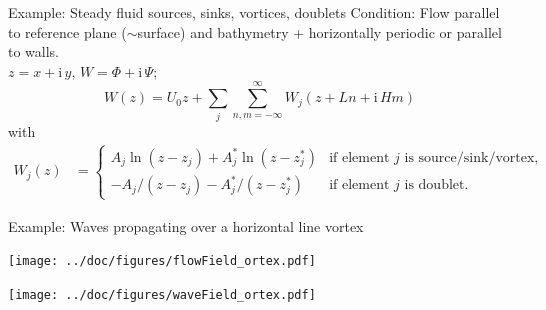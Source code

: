\documentclass{sintefbeamer}
\newcommand{\mr}{\mathrm}
\newcommand{\ii}{\mr{i}\,}
\renewcommand{\_}[1]{_\mr{#1}}
\begin{document}
\begin{frame}{Example: Steady fluid sources, sinks, vortices, doublets}
	Condition: Flow parallel to reference plane ($\sim$surface) and bathymetry + horizontally periodic or parallel to walls.\\
	$z=x+\ii y$, $W=\Phi + \ii\Psi$;
	\begin{equation*}
		W(z) =  U_0 z + \sum_j \sum_{n,m=-\infty}^{\infty} W_j(z + L n + \ii H m)
	\end{equation*}
	with
	\begin{align*}
		W_j(z) &= 
		\begin{cases}
			A_j\ln(z-z_j) + A_j^*\ln(z-z_j^*) & \text{if element $j$ is source/sink/vortex,}\\
			-A_j/(z-z_j)-A_j^*/(z-z_j^*) & \text{if element $j$ is doublet.}
		\end{cases}
	\end{align*}
\end{frame}

\begin{frame}{Example: Waves propagating over a horizontal line vortex}
\centering
\vspace{-.25cm}
\begin{minipage}{.5\framewidth}
\texttt{[image: ../doc/figures/flowField\_vortex.pdf]}%
\end{minipage}%
\texttt{[image: ../doc/figures/waveField\_vortex.pdf]}%
\end{frame}
\end{document}
